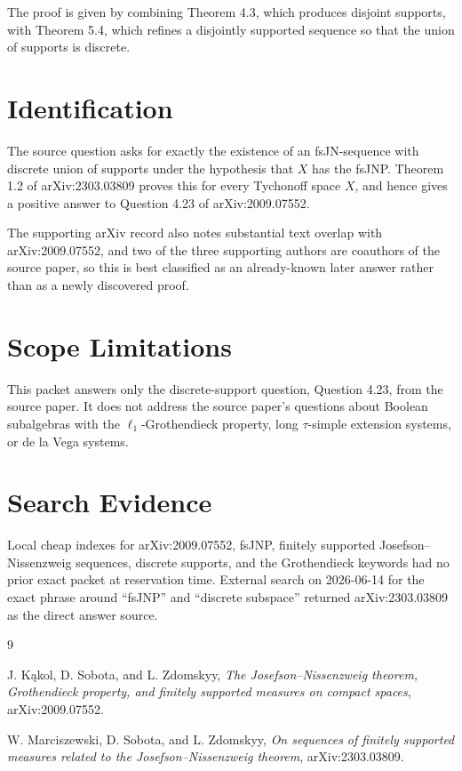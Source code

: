 \documentclass[11pt]{article}
\begin{document}
The proof is given by combining Theorem 4.3, which produces disjoint supports,
with Theorem 5.4, which refines a disjointly supported sequence so that the
union of supports is discrete.

\section*{Identification}

The source question asks for exactly the existence of an fsJN-sequence with
discrete union of supports under the hypothesis that \(X\) has the fsJNP.
Theorem 1.2 of arXiv:2303.03809 proves this for every Tychonoff space \(X\),
and hence gives a positive answer to Question 4.23 of arXiv:2009.07552.

The supporting arXiv record also notes substantial text overlap with
arXiv:2009.07552, and two of the three supporting authors are coauthors of the
source paper, so this is best classified as an already-known later answer
rather than as a newly discovered proof.

\section*{Scope Limitations}

This packet answers only the discrete-support question, Question 4.23, from
the source paper.  It does not address the source paper's questions about
Boolean subalgebras with the \(\ell_1\)-Grothendieck property, long
\(\tau\)-simple extension systems, or de la Vega systems.

\section*{Search Evidence}

Local cheap indexes for arXiv:2009.07552, fsJNP, finitely supported
Josefson--Nissenzweig sequences, discrete supports, and the Grothendieck
keywords had no prior exact packet at reservation time.  External search on
2026-06-14 for the exact phrase around ``fsJNP'' and ``discrete subspace''
returned arXiv:2303.03809 as the direct answer source.

\begin{thebibliography}{9}

J. K\k{a}kol, D. Sobota, and L. Zdomskyy,
\emph{The Josefson--Nissenzweig theorem, Grothendieck property, and finitely
supported measures on compact spaces}, arXiv:2009.07552.

W. Marciszewski, D. Sobota, and L. Zdomskyy,
\emph{On sequences of finitely supported measures related to the
Josefson--Nissenzweig theorem}, arXiv:2303.03809.

\end{thebibliography}
\end{document}
